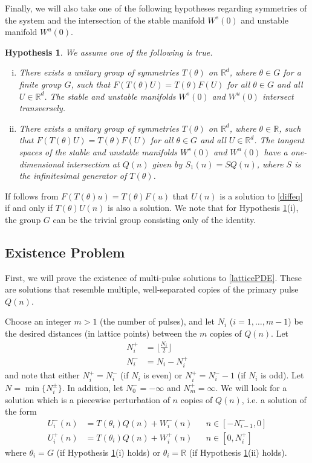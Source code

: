 \documentclass[12pt]{article}
\def\R{{\mathbb R}}
\newtheorem{hypothesis}{Hypothesis}
\begin{document}
Finally, we will also take one of the following hypotheses regarding symmetries of the system and the intersection of the stable manifold $W^s(0)$ and unstable manifold $W^u(0)$.
\begin{hypothesis}\label{intersectionhyp}
We assume one of the following is true.
\begin{enumerate}[(i)]
\item There exists a unitary group of symmetries $T(\theta)$ on $\R^d$, where $\theta \in G$ for a finite group $G$, such that $F(T(\theta)U) = T(\theta)F(U)$ for all $\theta \in G$ and all $U \in \R^d$. The stable and unstable manifolds $W^s(0)$ and $W^u(0)$ intersect transversely.
\item There exists a unitary group of symmetries $T(\theta)$ on $\R^d$, where $\theta \in \R$, such that $F(T(\theta)U) = T(\theta)F(U)$ for all $\theta \in G$ and all $U \in \R^d$. The tangent spaces of the stable and unstable manifolds $W^s(0)$ and $W^u(0)$ have a one-dimensional intersection at $Q(n)$ given by $S_1(n) = S Q(n)$, where $S$ is the infinitesimal generator of $T(\theta)$.
\end{enumerate}
\end{hypothesis}

If follows from $F(T(\theta)u) = T(\theta)F(u)$ that $U(n)$ is a solution to \eqref{diffeq} if and only if $T(\theta)U(n)$ is also a solution. We note that for Hypothesis \ref{intersectionhyp}(i), the group $G$ can be the trivial group consisting only of the identity.

\subsection{Existence Problem}
First, we will prove the existence of multi-pulse solutions to \eqref{latticePDE}. These are solutions that resemble multiple, well-separated copies of the primary pulse $Q(n)$.

Choose an integer $m > 1$ (the number of pulses), and let $N_i$ ($i = 1, \dots, m-1$) be the desired distances (in lattice points) between the $m$ copies of $Q(n)$. Let 
\begin{equation}\label{Nipm}
\begin{aligned}
N_i^+ &= \lfloor \frac{N_i}{2} \rfloor \\
N_i^- &= N_i - N_i^+
\end{aligned}
\end{equation}
and note that either $N_i^+ = N_i^-$ (if $N_i$ is even) or $N_i^+ = N_i^- - 1$ (if $N_i$ is odd). Let $N = \min\{ N_i^\pm \}$. In addition, let $N_0^- = -\infty$ and $N_m^+ = \infty$. We will look for a solution which is a piecewise perturbation of $n$ copies of $Q(n)$, i.e. a solution of the form
\begin{align}\label{Upiecewise}
U_i^-(n) &= T(\theta_i) Q(n) + W_i^-(n) && n \in [-N_{i-1}^-, 0] \\
U_i^+(n) &= T(\theta_i) Q(n) + W_i^+(n) && n \in [0, N_i^+]
\end{align}
where $\theta_i = G$ (if Hypothesis \ref{intersectionhyp}(i) holds) or $\theta_i = \R$ (if Hypothesis \ref{intersectionhyp}(ii) holds). 
\end{document}
